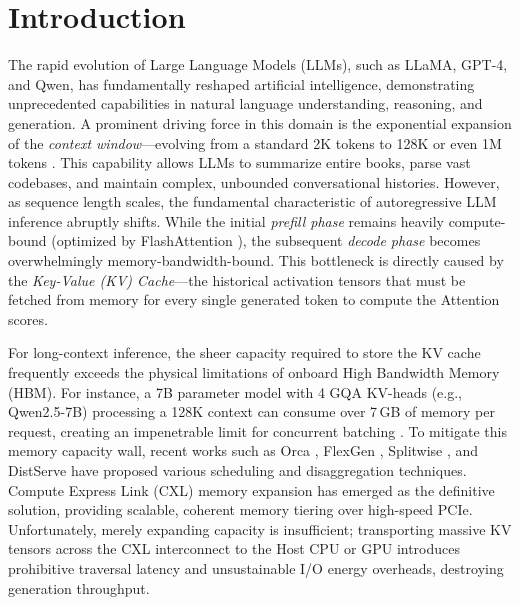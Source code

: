 \documentclass[10pt,conference]{IEEEtran}
\begin{document}
\section{Introduction}

The rapid evolution of Large Language Models (LLMs), such as LLaMA, GPT-4, and Qwen, has fundamentally reshaped artificial intelligence, demonstrating unprecedented capabilities in natural language understanding, reasoning, and generation. A prominent driving force in this domain is the exponential expansion of the \textit{context window}—evolving from a standard 2K tokens to 128K or even 1M tokens \cite{llm_context, ring_attention}. This capability allows LLMs to summarize entire books, parse vast codebases, and maintain complex, unbounded conversational histories. However, as sequence length scales, the fundamental characteristic of autoregressive LLM inference abruptly shifts. While the initial \textit{prefill phase} remains heavily compute-bound (optimized by FlashAttention \cite{flashattn}), the subsequent \textit{decode phase} becomes overwhelmingly memory-bandwidth-bound. This bottleneck is directly caused by the \textit{Key-Value (KV) Cache}—the historical activation tensors that must be fetched from memory for every single generated token to compute the Attention scores.

For long-context inference, the sheer capacity required to store the KV cache frequently exceeds the physical limitations of onboard High Bandwidth Memory (HBM). For instance, a 7B parameter model with 4 GQA KV-heads (e.g., Qwen2.5-7B) processing a 128K context can consume over 7\,GB of memory per request, creating an impenetrable limit for concurrent batching \cite{kv_cache_bottleneck}. To mitigate this memory capacity wall, recent works such as Orca \cite{orca}, FlexGen \cite{flexgen}, Splitwise \cite{splitwise}, and DistServe \cite{distserve} have proposed various scheduling and disaggregation techniques. Compute Express Link (CXL) \cite{cxl_standard} memory expansion has emerged as the definitive solution, providing scalable, coherent memory tiering over high-speed PCIe. Unfortunately, merely expanding capacity is insufficient; transporting massive KV tensors across the CXL interconnect to the Host CPU or GPU introduces prohibitive traversal latency and unsustainable I/O energy overheads, destroying generation throughput.
\end{document}
